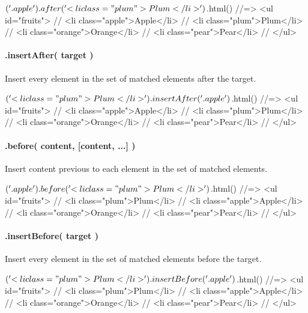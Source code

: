 \begin{DoxyCode}
$('.apple').after('<li class="plum">Plum</li>')
$.html()
//=>  <ul id="fruits">
//      <li class="apple">Apple</li>
//      <li class="plum">Plum</li>
//      <li class="orange">Orange</li>
//      <li class="pear">Pear</li>
//    </ul>
\end{DoxyCode}


\paragraph*{.insert\+After( target )}

Insert every element in the set of matched elements after the target.


\begin{DoxyCode}
$('<li class="plum">Plum</li>').insertAfter('.apple')
$.html()
//=>  <ul id="fruits">
//      <li class="apple">Apple</li>
//      <li class="plum">Plum</li>
//      <li class="orange">Orange</li>
//      <li class="pear">Pear</li>
//    </ul>
\end{DoxyCode}


\paragraph*{.before( content, \mbox{[}content, ...\mbox{]} )}

Insert content previous to each element in the set of matched elements.


\begin{DoxyCode}
$('.apple').before('<li class="plum">Plum</li>')
$.html()
//=>  <ul id="fruits">
//      <li class="plum">Plum</li>
//      <li class="apple">Apple</li>
//      <li class="orange">Orange</li>
//      <li class="pear">Pear</li>
//    </ul>
\end{DoxyCode}


\paragraph*{.insert\+Before( target )}

Insert every element in the set of matched elements before the target.


\begin{DoxyCode}
$('<li class="plum">Plum</li>').insertBefore('.apple')
$.html()
//=>  <ul id="fruits">
//      <li class="plum">Plum</li>
//      <li class="apple">Apple</li>
//      <li class="orange">Orange</li>
//      <li class="pear">Pear</li>
//    </ul>
\end{DoxyCode}


